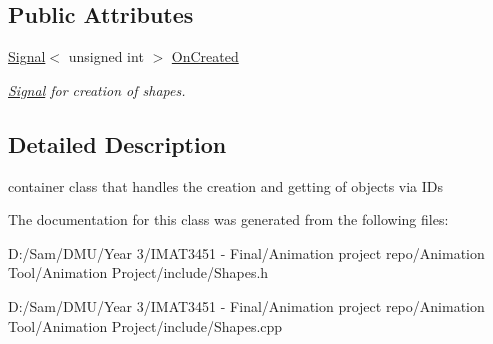 \subsection*{Public Attributes}
\begin{DoxyCompactItemize}
\item 
\mbox{\label{class_shapes_aa818577f33ff41432500e96cfb07d1f9}} 
\hyperlink{class_signal}{Signal}$<$ unsigned int $>$ \hyperlink{class_shapes_aa818577f33ff41432500e96cfb07d1f9}{On\+Created}
\begin{DoxyCompactList}\small\item\em \hyperlink{class_signal}{Signal} for creation of shapes. \end{DoxyCompactList}\end{DoxyCompactItemize}


\subsection{Detailed Description}
container class that handles the creation and getting of objects via I\+Ds 

The documentation for this class was generated from the following files\+:\begin{DoxyCompactItemize}
\item 
D\+:/\+Sam/\+D\+M\+U/\+Year 3/\+I\+M\+A\+T3451 -\/ Final/\+Animation project repo/\+Animation Tool/\+Animation Project/include/Shapes.\+h\item 
D\+:/\+Sam/\+D\+M\+U/\+Year 3/\+I\+M\+A\+T3451 -\/ Final/\+Animation project repo/\+Animation Tool/\+Animation Project/include/Shapes.\+cpp\end{DoxyCompactItemize}
